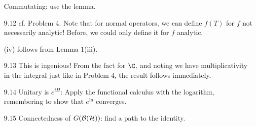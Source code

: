 Commutating: use the lemma.

9.12 cf. Problem 4. Note that for normal operators, we can define $f(T)$ for $f$ not necessarily analytic! Before, we could only define it for $f$ analytic. 

(iv) follows from Lemma 1(iii). 

9.13 This is ingenious! From the fact for $\C$, and noting we have multiplicativity in the integral just like in Problem 4, the result follows immediately.

9.14 Unitary is $e^{iH}$: Apply the functional calculus with the logarithm, remembering to show that $e^{\ln}$ converges.

9.15 Connectedness of $G(\cal B(H))$: find a path to the identity.